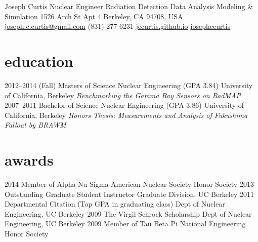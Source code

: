 \documentclass{resume} %
\begin{document}
\header
{Joseph }
{Curtis}
{Nuclear Engineer}
{Radiation Detection \space \faPlusSign \space\space Data Analysis \space \faPlusSign \space\space Modeling \& Simulation}
{1526 Arch St Apt 4 Berkeley, CA 94708, USA\space\space\faHome}
{\href{mailto:joseph.c.curtis@gmail.com}{joseph.c.curtis@gmail.com}\space\space\faEnvelopeAlt}
{(831) 277 6231\space\space\faPhone}
{\href{http://jccurtis.github.io}{jccurtis.github.io}\space\space\faGithub}
{\href{http://www.linkedin.com/in/josephccurtis}{josephccurtis}\space\space\faLinkedinSign}

\section{education}
\begin{entrylist}
	\entry
		{2012--2014 (Fall)}
		{Masters of Science {\normalfont Nuclear Engineering (GPA 3.84)}}
		{University of California, Berkeley}
		{
		\emph{Benchmarking the Gamma Ray Sensors on RadMAP}
		}
	\entry
		{2007--2011}
		{Bachelor of Science {\normalfont Nuclear Engineering (GPA 3.86)}}
		{University of California, Berkeley}
		{
		\emph{Honors Thesis: Measurements and Analysis of Fukushima Fallout by BRAWM}
		}
\end{entrylist}

\section{awards}
\begin{entrylist}
	\entrymin
		{2014}
		{Member of Alpha Nu Sigma}
		{American Nuclear Society Honor Society}
	\entrymin
		{2013}
		{Outstanding Graduate Student Instructor}
		{Graduate Division, UC Berkeley}
	\entrymin
		{2011}
		{Departmental Citation (Top GPA in graduating class)}
		{Dept of Nuclear Engineering, UC Berkeley}
	\entrymin
		{2009}
		{The Virgil Schrock Scholarship}
		{Dept of Nuclear Engineering, UC Berkeley}
	\entrymin
		{2009}
		{Member of Tau Beta Pi}
		{National Engineering Honor Society}
\end{entrylist}
\end{document}
